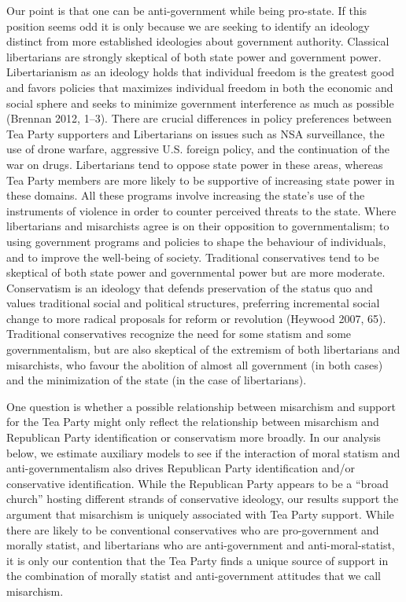 \documentclass[12pt,]{article}
\begin{document}
Our point is that one can be anti-government while being pro-state. If
this position seems odd it is only because we are seeking to identify an
ideology distinct from more established ideologies about government
authority. Classical libertarians are strongly skeptical of both state
power and government power. Libertarianism as an ideology holds that
individual freedom is the greatest good and favors policies that
maximizes individual freedom in both the economic and social sphere and
seeks to minimize government interference as much as possible (Brennan
2012, 1--3). There are crucial differences in policy preferences between
Tea Party supporters and Libertarians on issues such as NSA
surveillance, the use of drone warfare, aggressive U.S. foreign policy,
and the continuation of the war on drugs. Libertarians tend to oppose
state power in these areas, whereas Tea Party members are more likely to
be supportive of increasing state power in these domains. All these
programs involve increasing the state's use of the instruments of
violence in order to counter perceived threats to the state. Where
libertarians and misarchists agree is on their opposition to
governmentalism; to using government programs and policies to shape the
behaviour of individuals, and to improve the well-being of society.
Traditional conservatives tend to be skeptical of both state power and
governmental power but are more moderate. Conservatism is an ideology
that defends preservation of the status quo and values traditional
social and political structures, preferring incremental social change to
more radical proposals for reform or revolution (Heywood 2007, 65).
Traditional conservatives recognize the need for some statism and some
governmentalism, but are also skeptical of the extremism of both
libertarians and misarchists, who favour the abolition of almost all
government (in both cases) and the minimization of the state (in the
case of libertarians).

One question is whether a possible relationship between misarchism and
support for the Tea Party might only reflect the relationship between
misarchism and Republican Party identification or conservatism more
broadly. In our analysis below, we estimate auxiliary models to see if
the interaction of moral statism and anti-governmentalism also drives
Republican Party identification and/or conservative identification.
While the Republican Party appears to be a ``broad church'' hosting
different strands of conservative ideology, our results support the
argument that misarchism is uniquely associated with Tea Party support.
While there are likely to be conventional conservatives who are
pro-government and morally statist, and libertarians who are
anti-government and anti-moral-statist, it is only our contention that
the Tea Party finds a unique source of support in the combination of
morally statist and anti-government attitudes that we call misarchism.
\end{document}
